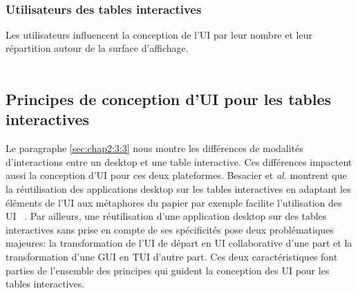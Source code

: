 \\

\subsubsection{Utilisateurs des tables interactives }
\label{sec:chap2:3:4:3}
Les utilisateurs influencent la conception de l'UI par leur nombre et leur répartition autour de la surface d'affichage.\\

\\

\subsection{Principes de conception d'UI pour les tables interactives}
\label{sec:chap2:3:5}
Le paragraphe \ref{sec:chap2:3:3} nous montre les différences de modalités d'interactions entre un desktop et une table interactive. Ces différences impactent aussi la conception d'UI pour ces deux plateformes. Besacier et \textit{al.} montrent que la réutilisation des applications desktop sur les tables interactives en adaptant les éléments de l'UI aux métaphores du papier par exemple facilite l'utilisation des UI ~\cite{Besacier2007}. Par ailleurs, une réutilisation d'une application desktop sur des tables interactives sans prise en compte de ses spécificités pose deux problématiques majeures: la transformation de l'UI de départ en UI collaborative d'une part et la transformation d'une GUI en TUI d'autre part. Ces deux caractéristiques font parties de l'ensemble des principes qui guident la conception des UI pour les tables interactives.\\

